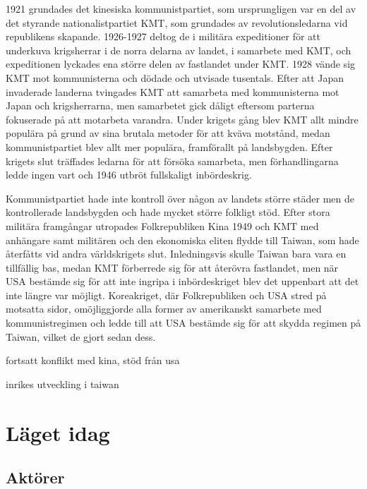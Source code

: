 \documentclass[a4paper,10pt]{article}
\begin{document}
1921 grundades det kinesiska kommunistpartiet, som ursprungligen var en del av det styrande nationalistpartiet KMT, som grundades av revolutionsledarna vid republikens skapande. 1926-1927 deltog de i militära expeditioner för att underkuva krigsherrar i de norra delarna av landet, i samarbete med KMT, och expeditionen lyckades ena större delen av fastlandet under KMT. 1928 vände sig KMT mot kommunisterna och dödade och utvisade tusentals. Efter att Japan invaderade landerna tvingades KMT att samarbeta med kommunisterna mot Japan och krigsherrarna, men samarbetet gick dåligt eftersom parterna fokuserade på att motarbeta varandra. Under krigets gång blev KMT allt mindre populära på grund av sina brutala metoder för att kväva motstånd, medan kommunistpartiet blev allt mer populära, framförallt på landsbygden. Efter krigets slut träffades ledarna för att försöka samarbeta, men förhandlingarna ledde ingen vart och 1946 utbröt fullskaligt inbördeskrig.

Kommunistpartiet hade inte kontroll över någon av landets större städer men de kontrollerade landsbygden och hade mycket större folkligt stöd. Efter stora militära framgångar utropades Folkrepubliken Kina 1949 och KMT med anhängare samt militären och den ekonomiska eliten flydde till Taiwan, som hade återfåtts vid andra världskrigets slut. Inledningsvis skulle Taiwan bara vara en tillfällig bas, medan KMT förberrede sig för att återövra fastlandet, men när USA bestämde sig för att inte ingripa i inbördeskriget blev det uppenbart att det inte längre var möjligt. Koreakriget, där Folkrepubliken och USA stred på motsatta sidor, omöjliggjorde alla former av amerikanskt samarbete med kommunistregimen och ledde till att USA bestämde sig för att skydda regimen på Taiwan, vilket de gjort sedan dess.




fortsatt konflikt med kina, stöd från usa

inrikes utveckling i taiwan



\section*{Läget idag}


\subsection*{Aktörer}
\end{document}
